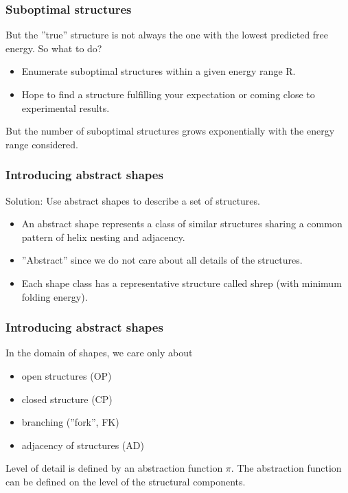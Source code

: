 \documentclass[ignorenonframetext,10pt]{beamer}
\begin{document}
\begin{frame}
\frametitle{Suboptimal structures}
    But the ''true'' structure is not always the one with the lowest
    predicted free energy.
    So what to do?
    \begin{itemize} 
    \item Enumerate suboptimal structures within a given energy range R.
    \item Hope to find a structure fulfilling your expectation or coming close
    to experimental results.
    \end{itemize}
    But the number of suboptimal structures grows exponentially with the energy
    range considered.
\end{frame}

\begin{frame}
\frametitle{Introducing abstract shapes}
    Solution: Use abstract shapes to describe a set of structures.
    \begin{itemize} 
    \item An abstract shape represents a class of similar structures sharing a
    common pattern of helix nesting and adjacency.
    \item ''Abstract'' since we do not care about all details of the structures.
    \item Each shape class has a representative structure called shrep (with minimum folding energy).
    \end{itemize}
\end{frame}

\begin{frame}
\frametitle{Introducing abstract shapes}
    In the domain of shapes, we care only about
    \begin{itemize} 
    \item open structures (OP)
    \item closed structure (CP)
    \item branching (''fork'', FK)
    \item adjacency of structures (AD)
    \end{itemize}
    Level of detail is defined by an abstraction function $\pi$.
    The abstraction function can be defined on the level of the structural components.
\end{frame}
\end{document}
